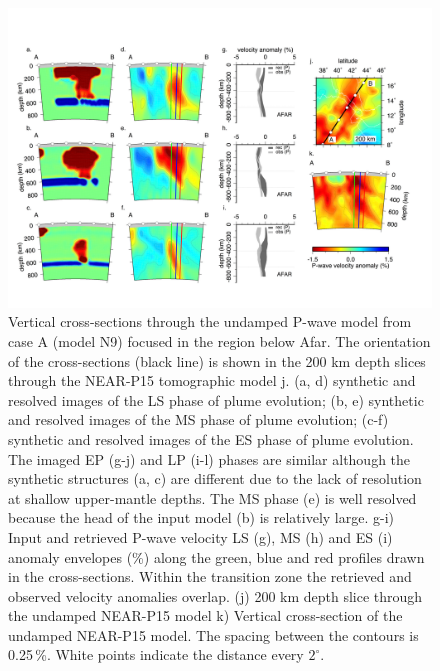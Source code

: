 \documentclass[a4paper,10pt,twocolumn]{paper}
\begin{document}
\begin{figure}
\centering
\includegraphics[width=16cm]{../figures-working/fig09.png}
\caption{Vertical cross-sections through the undamped P-wave model from case A (model N9) focused in the region below Afar.  The orientation of the cross-sections (black line) is shown in the 200 km depth slices through the NEAR-P15 tomographic model  j. (a, d) synthetic and resolved images of the LS phase of plume evolution; (b, e) synthetic and resolved images of the MS phase of plume evolution; (c-f) synthetic and resolved images of the ES phase of plume evolution. The imaged EP (g-j) and LP (i-l) phases are similar although the synthetic structures (a, c) are different due to the lack of resolution at shallow upper-mantle depths. The MS phase (e) is well resolved because the head of the input model (b) is relatively large. g-i) Input and retrieved P-wave velocity LS (g), MS (h) and ES (i) anomaly envelopes (\%) along the green, blue and red profiles drawn in the cross-sections. Within the transition zone the retrieved and observed velocity anomalies overlap. (j) 200 km depth slice through the undamped NEAR-P15 model k) Vertical cross-section of the undamped NEAR-P15 model. The spacing between the contours is 0.25\,\%. White points indicate the distance every $2^{\circ}$.}
\label{fg:8}
\end{figure}
\end{document}
